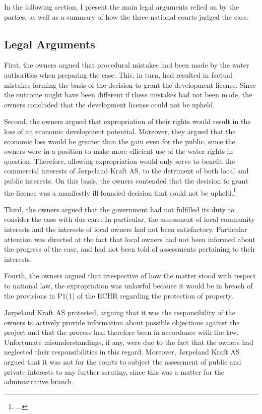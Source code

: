 In the following section, I present the main legal arguments relied on by the parties, as well as a summary of how the three national courts judged the case.

\subsection{Legal Arguments}\label{view}

First, the owners argued that procedural mistakes had been made by the water authorities when preparing the case. This, in turn, had resulted in factual mistakes forming the basis of the decision to grant the development license. Since the outcome might have been different if these mistakes had not been made, the owners concluded that the development license could not be upheld.

Second, the owners argued that expropriation of their rights would result in the loss of an economic development potential. Moreover, they argued that the economic loss would be greater than the gain even for the public, since the owners were in a position to make more efficient use of the water rights in question. Therefore, allowing expropriation would only serve to benefit the commercial interests of Jørpeland Kraft AS, to the detriment of both local and public interests. On this basis, the owners contended that the decision to grant the licence was a manifestly ill-founded decision that could not be upheld.\footnote{...}

Third, the owners argued that the government had not fulfilled its duty to consider the case with due care. In particular, the assessment of local community interests and the interests of local owners had not been satisfactory. Particular attention was directed at the fact that local owners had not been informed about the progress of the case, and had not been told of assessments pertaining to their interests.

Fourth, the owners argued that irrespective of how the matter stood with respect to national law, the expropriation was unlawful because it would be in breach of the provisions in P1(1) of the ECHR regarding the protection of property.

Jørpeland Kraft AS protested, arguing that it was the responsibility of the owners to actively provide information about possible objections against the project and that the process had therefore been in accordance with the law. Unfortunate misunderstandings, if any, were due to the fact that the owners had neglected their responsibilities in this regard. Moreover, Jørpeland Kraft AS argued that it was not for the courts to subject the assessment of public and private interests to any further scrutiny, since this was a matter for the administrative branch.

